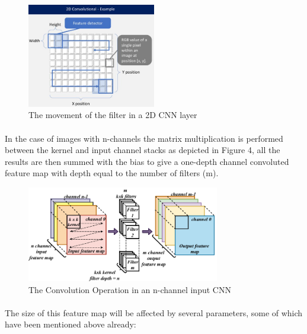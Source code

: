 \documentclass{article}
\begin{document}
    \begin{figure}[hbt!]
        \centering
        \includegraphics[width=0.5\textwidth]{2DCNN.jpg}
        \caption{The movement of the filter in a 2D CNN layer \cite{2dcnnpic}}
    \end{figure}
    
\paragraph{}   
In the case of images with n-channels the matrix multiplication is performed between the kernel and input channel stacks as depicted in Figure 4, all the results are then summed with the bias to give a one-depth channel convoluted feature map with depth equal to the number of filters (m).

    \begin{figure}[hbt!]
        \centering
        \includegraphics[width=0.75\textwidth]{Convolution-operation-in-a-CNN.png}
        \caption{The Convolution Operation in an n-channel input CNN \cite{9053228}}
    \end{figure}
    
\paragraph{}     
The size of this feature map will be affected by several parameters, some of which have been mentioned above already:
\end{document}

